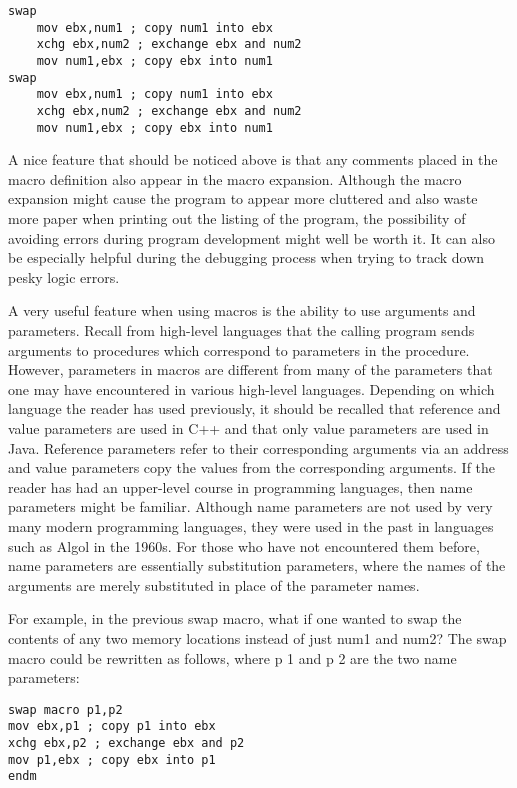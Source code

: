 \documentclass[10pt]{article}
\begin{document}
\begin{verbatim}
swap
    mov ebx,num1 ; copy num1 into ebx
    xchg ebx,num2 ; exchange ebx and num2
    mov num1,ebx ; copy ebx into num1
swap
    mov ebx,num1 ; copy num1 into ebx
    xchg ebx,num2 ; exchange ebx and num2
    mov num1,ebx ; copy ebx into num1
\end{verbatim}

A nice feature that should be noticed above is that any comments placed in the macro definition also appear in the macro expansion. Although the macro expansion might cause the program to appear more cluttered and also waste more paper when printing out the listing of the program, the possibility of avoiding errors during program development might well be worth it. It can also be especially helpful during the debugging process when trying to track down pesky logic errors.

A very useful feature when using macros is the ability to use arguments and parameters. Recall from high-level languages that the calling program sends arguments to procedures which correspond to parameters in the procedure. However, parameters in macros are different from many of the parameters that one may have encountered in various high-level languages. Depending on which language the reader has used previously, it should be recalled that reference and value parameters are used in C++ and that only value parameters are used in Java. Reference parameters refer to their corresponding arguments via an address and value parameters copy the values from the corresponding arguments. If the reader has had an upper-level course in programming languages, then name parameters might be familiar. Although name parameters are not used by very many modern programming languages, they were used in the past in languages such as Algol in the 1960s. For those who have not encountered them before, name parameters are essentially substitution parameters, where the names of the arguments are merely substituted in place of the parameter names.

For example, in the previous swap macro, what if one wanted to swap the contents of any two memory locations instead of just num1 and num2? The swap macro could be rewritten as follows, where p 1 and p 2 are the two name parameters:

\begin{verbatim}
swap macro p1,p2
mov ebx,p1 ; copy p1 into ebx
xchg ebx,p2 ; exchange ebx and p2
mov p1,ebx ; copy ebx into p1
endm
\end{verbatim}
\end{document}
